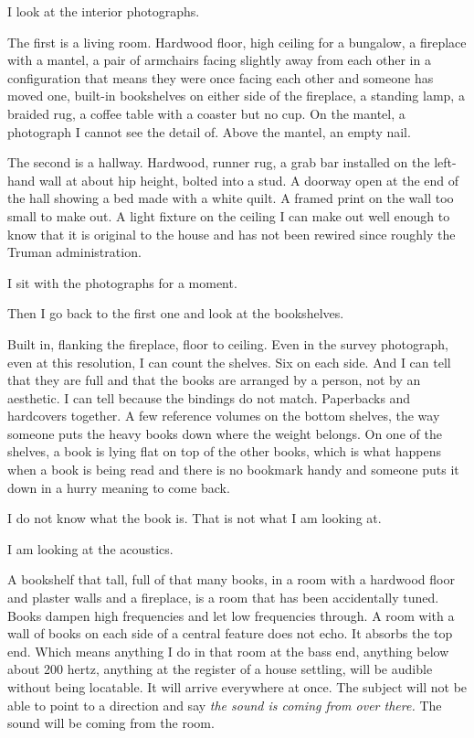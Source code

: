 I look at the interior photographs.

The first is a living room. Hardwood floor, high ceiling for a bungalow, a fireplace with a mantel, a pair of armchairs facing slightly away from each other in a configuration that means they were once facing each other and someone has moved one, built-in bookshelves on either side of the fireplace, a standing lamp, a braided rug, a coffee table with a coaster but no cup. On the mantel, a photograph I cannot see the detail of. Above the mantel, an empty nail.

The second is a hallway. Hardwood, runner rug, a grab bar installed on the left-hand wall at about hip height, bolted into a stud. A doorway open at the end of the hall showing a bed made with a white quilt. A framed print on the wall too small to make out. A light fixture on the ceiling I can make out well enough to know that it is original to the house and has not been rewired since roughly the Truman administration.

I sit with the photographs for a moment.

Then I go back to the first one and look at the bookshelves.

Built in, flanking the fireplace, floor to ceiling. Even in the survey photograph, even at this resolution, I can count the shelves. Six on each side. And I can tell that they are full and that the books are arranged by a person, not by an aesthetic. I can tell because the bindings do not match. Paperbacks and hardcovers together. A few reference volumes on the bottom shelves, the way someone puts the heavy books down where the weight belongs. On one of the shelves, a book is lying flat on top of the other books, which is what happens when a book is being read and there is no bookmark handy and someone puts it down in a hurry meaning to come back.

I do not know what the book is. That is not what I am looking at.

I am looking at the acoustics.

A bookshelf that tall, full of that many books, in a room with a hardwood floor and plaster walls and a fireplace, is a room that has been accidentally tuned. Books dampen high frequencies and let low frequencies through. A room with a wall of books on each side of a central feature does not echo. It absorbs the top end. Which means anything I do in that room at the bass end, anything below about 200 hertz, anything at the register of a house settling, will be audible without being locatable. It will arrive everywhere at once. The subject will not be able to point to a direction and say \emph{the sound is coming from over there.} The sound will be coming from the room.


